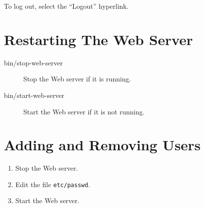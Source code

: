 \documentclass{article}
\begin{document}
To log out, select the ``Logout'' hyperlink.

\section{Restarting The Web Server}

\begin{description}
\item[bin/stop-web-server]{Stop the Web server if it is running.}
\item[bin/start-web-server]{Start the Web server if it is not running.}
\end{description}

\section{Adding and Removing Users}

\begin{enumerate}
\item{Stop the Web server.}
\item{Edit the file \verb|etc/passwd|.}
\item{Start the Web server.}
\end{enumerate}
\end{document}
